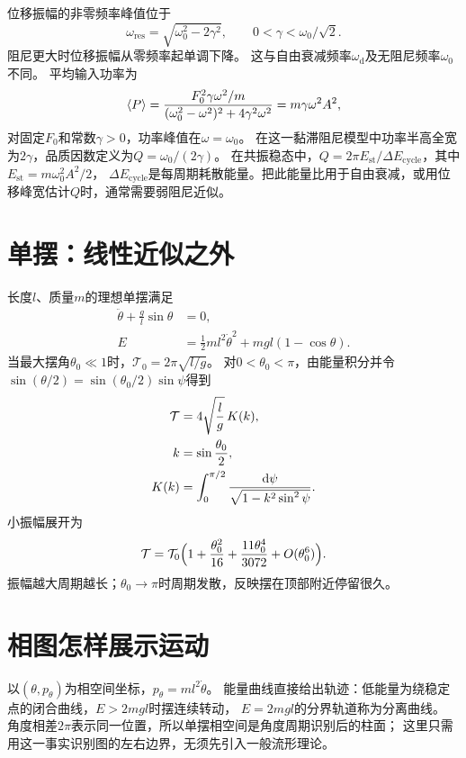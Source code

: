 位移振幅的非零频率峰值位于
\begin{equation}
 \omega_{\mathrm{res}} = \sqrt{\omega_0^2 - 2\gamma^2},\qquad
 0 < \gamma < \omega_0/\sqrt2.
\end{equation}
阻尼更大时位移振幅从零频率起单调下降。
这与自由衰减频率$\omega_{\mathrm d}$及无阻尼频率$\omega_0$不同。
平均输入功率为
\begin{equation}
 \langle P\rangle = \frac{F_0^2\gamma\omega^2/m}
 { (\omega_0^2 - \omega^2)^2 + 4\gamma^2\omega^2 }
 = m\gamma\omega^2A^2,
\end{equation}
对固定$F_0$和常数$\gamma > 0$，功率峰值在$\omega = \omega_0$。
在这一黏滞阻尼模型中功率半高全宽为$2\gamma$，品质因数定义为$Q = \omega_0/(2\gamma)$。
在共振稳态中，$Q = 2\pi E_{\mathrm{st}}/\Delta E_{\mathrm{cycle}}$，其中$E_{\mathrm{st}} = m\omega_0^2A^2/2$，
$\Delta E_{\mathrm{cycle}}$是每周期耗散能量。把此能量比用于自由衰减，或用位移峰宽估计$Q$时，通常需要弱阻尼近似。

\section{单摆：线性近似之外}
长度$l$、质量$m$的理想单摆满足
\begin{subequations}
 \begin{align}
  \ddot\theta + \frac gl\sin\theta &= 0,\\
  E &= \frac12ml^2\dot\theta^2 + mgl(1 - \cos\theta).
 \end{align}
\end{subequations}
当最大摆角$\theta_0 \ll 1$时，$\mathcal T_0 = 2\pi\sqrt{l/g}$。
对$0 < \theta_0 < \pi$，由能量积分并令$\sin(\theta/2) = \sin(\theta_0/2)\sin\psi$得到
\begin{subequations}
 \begin{align}
  \mathcal T &= 4\sqrt{\frac lg}\,K(k),\\
  k &= \sin\frac{\theta_0}2,\\
  K(k) &= \int_0^{\pi/2}\frac{\mathop{}\!\mathrm{d}\psi}{\sqrt{1 - k^2\sin^2\psi}}.
 \end{align}
\end{subequations}
小振幅展开为
\begin{equation}
 \mathcal T = \mathcal T_0\Bigl(1 + \frac{\theta_0^2}{16}
 + \frac{11\theta_0^4}{3072} + O(\theta_0^6)\Bigr).
\end{equation}
振幅越大周期越长；$\theta_0 \to \pi$时周期发散，反映摆在顶部附近停留很久。

\section{相图怎样展示运动}
以$(\theta,p_\theta)$为相空间坐标，$p_\theta = ml^2\dot\theta$。
能量曲线直接给出轨迹：低能量为绕稳定点的闭合曲线，$E > 2mgl$时摆连续转动，
$E = 2mgl$的分界轨道称为分离曲线。
角度相差$2\pi$表示同一位置，所以单摆相空间是角度周期识别后的柱面；
这里只需用这一事实识别图的左右边界，无须先引入一般流形理论。

